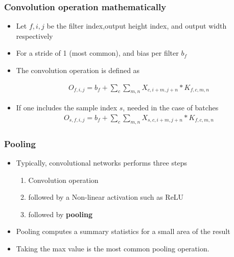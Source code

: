 \documentclass{beamer}
\begin{document}
\begin{frame}
    \frametitle{Convolution operation mathematically}
\begin{itemize}
    \item Let $f,i,j$ be the filter index,output height index, and output width respectively
    \item For a stride of 1 (most common), and bias per filter $b_f$
    \item The convolution operation is defined as
    
\begin{align*}
O_{f,i,j}=b_f+\sum_c\sum_{m,n}X_{c,i+m,j+n}*K_{f,c,m,n}
\end{align*}
\item If one includes the sample index $s$, needed in the case of batches
\begin{align*}
    O_{s,f,i,j}=b_f+\sum_c\sum_{m,n}X_{s,c,i+m,j+n}*K_{f,c,m,n}
    \end{align*}
\end{itemize}

\end{frame}
\begin{frame}
    \frametitle{Pooling}

    \begin{itemize}
        \item Typically, convolutional networks performs three steps 
        \begin{enumerate}
            \item Convolution operation
            \item followed by a Non-linear activation such as ReLU 
            \item followed by \textbf{pooling}
        \end{enumerate}
\item Pooling computes a summary statistics for a small area of the result
\item Taking the max value is the most common pooling operation.
    \end{itemize}

\end{frame}
\end{document}
